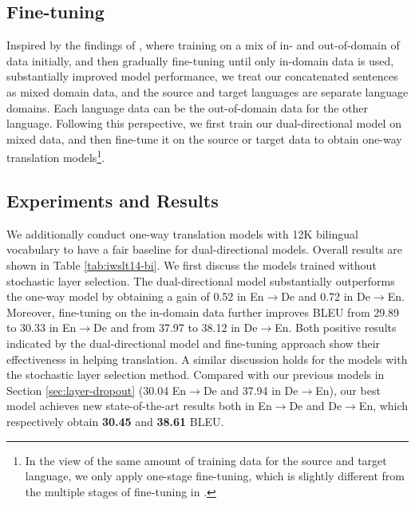 \documentclass[11pt]{article}
\begin{document}
\subsection{Fine-tuning}
Inspired by the findings of \citet{xu-etal-2021-gradual}, where training on a mix of in- and out-of-domain of data initially, and then gradually fine-tuning until only in-domain data is used, substantially improved model performance, we treat our concatenated sentences as mixed domain data, and the source and target languages are separate language domains. Each language data can be the out-of-domain data for the other language. Following this perspective, we first train our dual-directional model on mixed data, and then fine-tune it on the source or target data to obtain one-way translation models\footnote{In the view of the same amount of training data for the source and target language, we only apply one-stage fine-tuning, which is slightly different from the multiple stages of fine-tuning in \citet{xu-etal-2021-gradual}.}. 

\subsection{Experiments and Results}
We additionally conduct one-way translation models with 12K bilingual vocabulary to have a fair baseline for dual-directional models. Overall results are shown in Table \ref{tab:iwslt14-bi}. We first discuss the models trained without stochastic layer selection. The dual-directional model substantially outperforms the one-way model by obtaining a gain of 0.52 in En$\rightarrow$De and 0.72 in De$\rightarrow$En. Moreover, fine-tuning on the in-domain data further improves BLEU from 29.89 to 30.33 in En$\rightarrow$De and from 37.97 to 38.12 in De$\rightarrow$En. Both positive results indicated by the dual-directional model and fine-tuning approach show their effectiveness in helping translation. A similar discussion holds for the models with the stochastic layer selection method. Compared with our previous models in Section \ref{sec:layer-dropout} (30.04 En$\rightarrow$De and 37.94 in De$\rightarrow$En), our best model achieves new state-of-the-art results both in En$\rightarrow$De and De$\rightarrow$En, which respectively obtain \textbf{30.45} and \textbf{38.61} BLEU. 
\end{document}
